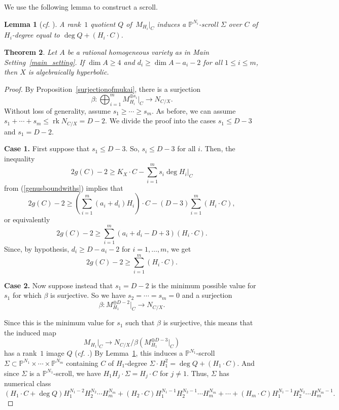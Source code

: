 \documentclass[11pt]{amsart}
\numberwithin{equation}{section}
\newtheorem{theorem}{Theorem}[section]
\newtheorem{lemma}[theorem]{Lemma}
\theoremstyle{definition}
\theoremstyle{remark}
\renewcommand{\P}{\mathbb{P}}
\DeclareMathOperator{\rk}{rk}
\newcommand{\lra}{\longrightarrow}
\begin{document}
We use the following lemma to construct a scroll.

\begin{lemma}[\textit{cf.} {\cite[Lemma 2.13]{CR19}}]\label{scroll}
A rank~$1$ quotient $Q$ of\, $M_{H_i}|_C$ induces a $\P^{N_i}$-scroll $\Sigma$ over $C$ of\, $H_i$-degree equal to $\deg Q + (H_i\cdot C)$.
\end{lemma}

\begin{theorem}\label{scroll_method}
Let $A$ be a rational homogeneous variety as in Main Setting~\ref{main_setting}. If $\dim A\ge 4$ and $d_i\ge \dim A-a_i-2$ for all $1\le i\le m$, then $X$ is algebraically hyperbolic.
\end{theorem}
\begin{proof}
By Proposition~\ref{surjectionofmukai}, there is a surjection 
\[ \beta \colon \bigoplus_{i=1}^{m} M_{H_i}^{\oplus s_i}|_C\lra N_{C/X}. \]
Without loss of generality, assume $s_1\ge \cdots \ge s_m$. As before, we can assume $s_1 + \cdots + s_m\le \rk N_{C/X} = D - 2$. We divide the proof into the cases $s_1\le D - 3$ and $s_1 = D - 2$.

\textbf{Case 1.} First suppose that $s_1\le D - 3$. So, $s_i\le D-3$ for all $i$. Then, the inequality  
\[ 2g(C)-2\ge K_{X}\cdot C - \sum_{i=1}^{m} s_i\deg H_i|_{C} \]
from (\ref{genusboundwiths}) implies that
\[ 2g(C)-2\ge \left (\sum_{i=1}^m (a_i+d_i)H_i\right )\cdot C - (D-3)\sum_{i=1}^{m} (H_i\cdot C), \]
or equivalently
\[ 2g(C)-2\ge \sum_{i=1}^m (a_i+d_i - D + 3)(H_i\cdot C). \]
Since, by hypothesis, $d_i\ge D-a_i-2$ for $i=1, \hdots , m$, we get
\[ 2g(C)-2\ge \sum_{i=1}^m (H_i\cdot C). \]

\textbf{Case 2.} Now suppose  instead that $s_1 = D-2$ is the minimum possible value for $s_1$ for which $\beta$ is surjective. So we have $s_2=\cdots =s_m=0$ and a surjection
\[ \beta \colon M_{H_1}^{\oplus D-2}|_C \lra N_{C/X}. \]

Since this is the minimum value for $s_1$ such that $\beta$ is surjective, this means that the induced map
\begin{equation}\label{quot_map}
    M_{H_1}|_{C} \lra N_{C/X} / \beta \left (M_{H_1}^{\oplus D-3}|_C\right )
\end{equation}
has a rank~$1$ image $Q$ (\textit{cf.} \cite[Section 2.2]{Cl03}.) By Lemma~\ref{scroll}, this induces a $\P^{N_1}$-scroll $\Sigma \subset \P^{N_1}\times \cdots \times \P^{N_m}$ containing $C$ of $H_1$-degree $\Sigma \cdot H_1^2 = \deg Q + (H_1\cdot C)$. And since $\Sigma$ is a $\P^{N_1}$-scroll, we have $H_1H_j\cdot \Sigma = H_j\cdot C$ for $j\neq 1$. Thus, $\Sigma$ has numerical class
\[ (H_1\cdot C + \deg Q)H_1^{N_1-2}H_2^{N_2}\cdots H_m^{N_m} + (H_2\cdot C)H_1^{N_1-1}H_2^{N_2-1}\cdots H_m^{N_m} + \cdots + (H_m\cdot C)H_1^{N_1-1}H_2^{N_2}\cdots H_m^{N_m-1}. \]


\end{proof}
\end{document}
